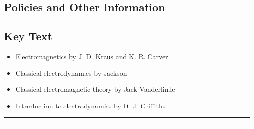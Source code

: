 
\subsection*{Policies and Other Information}
\subsection*{Key Text}

\begin{itemize}
    \item Electromagnetics by J. D. Kraus and K. R. Carver
    \item Classical electrodynamics by Jackson
    \item Classical electromagnetic theory by Jack Vanderlinde
    \item Introduction to electrodynamics by D. J. Griffiths
\end{itemize}
\vspace{2ex}\hrule
\vspace{2ex}\hrule\vspace{2ex}
